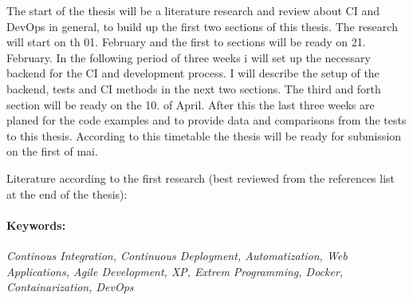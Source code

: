 The start of the thesis will be a literature research and review about CI and DevOps in general, to build up the first two sections of this
thesis. The research will start on th 01. February and the first to sections will be ready on 21. February. In the following period
of three weeks i will set up the necessary backend for the CI and development process. I will describe the setup of the backend, tests and
CI methods in the next two sections. The third and forth section will be ready on the 10. of April. After this the last three weeks are
planed for the code examples and to provide data and comparisons from the tests to this thesis. According to this timetable the thesis will
be ready for submission on the first of mai.

Literature according to the first research (best reviewed from the references list at the end of the thesis):


\paragraph{Keywords:}
\textit{Continous Integration, Continuous Deployment, Automatization, Web Applications, Agile Development, XP, Extrem Programming, Docker, Containarization, DevOps }
